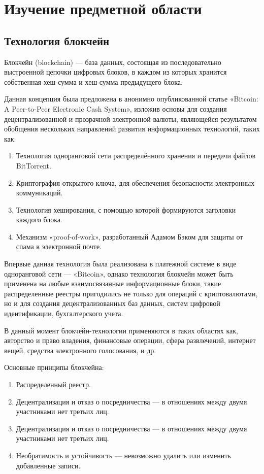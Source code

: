 \chapter{Изучение предметной области}

\section{Технология блокчейн}

Блокчейн (blockchain) — база данных, состоящая из последовательно выстроенной цепочки цифровых блоков, в каждом из которых хранится собственная хеш-сумма и хеш-сумма предыдущего блока.

Данная концепция была предложена в анонимно опубликованной статье «Bitcoin: A Peer-to-Peer Electronic Cash System», изложив основы для создания децентрализованной и прозрачной электронной валюты, являющейся результатом обобщения нескольких направлений развития информационных технологий, таких как:

\begin{enumerate} 
  \item Технология одноранговой сети распределённого хранения и передачи файлов BitTorrent.
  
  \item Криптография открытого ключа, для обеспечения безопасности электронных коммуникаций.
  
  \item Технология хеширования, с помощью которой формируются заголовки каждого блока.
  
  \item Механизм «proof-of-work», разработанный Адамом Бэком для защиты от спама в электронной почте.
\end{enumerate}

Впервые данная технология была реализована в платежной системе в виде одноранговой сети — «Bitcoin», однако технология блокчейн может быть применена на любые взаимосвязанные информационные блоки, такие распределенные реестры пригодились не только для операций с криптовалютами, но и для создания децентрализованных баз данных, систем цифровой идентификации, бухгалтерского учета.

В данный момент блокчейн-технологии применяются в таких областях как, авторство и право владения, финансовые операции, сфера развлечений, интернет вещей, средства электронного голосования, и др.

Основные принципы блокчейна:

\begin{enumerate} 
  \item Распределенный реестр.
  
  \item Децентрализация и отказ о посредничества — в отношениях между двумя участниками нет третьих лиц.
  
  \item Децентрализация и отказ о посредничества — в отношениях между двумя участниками нет третьих лиц.
  
  \item Необратимость и устойчивость — невозможно удалить или изменить добавленные записи.
\end{enumerate}

